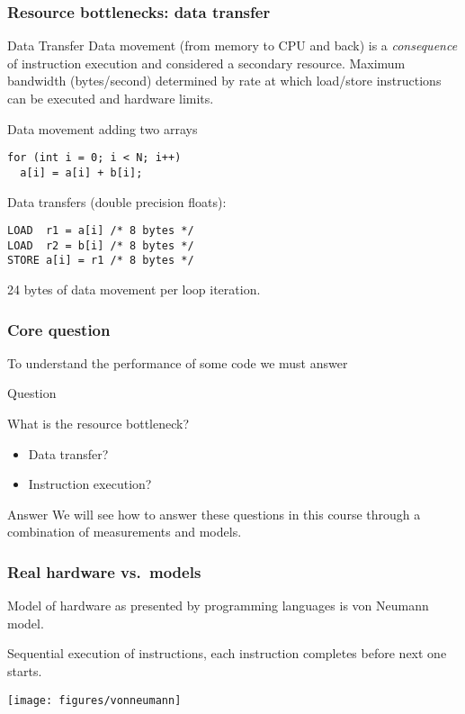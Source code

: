 \documentclass[presentation,aspectratio=43,10pt]{beamer}
\begin{document}
\begin{frame}[fragile]
  \frametitle{Resource bottlenecks: data transfer}
  \begin{block}{Data Transfer}
    Data movement (from memory to CPU and back) is a
    \emph{consequence} of instruction execution and considered a
    secondary resource. Maximum bandwidth (bytes/second) determined by
    rate at which load/store instructions can be executed and hardware limits.
  \end{block}
  \begin{exampleblock}{Data movement adding two arrays}
\begin{verbatim}
for (int i = 0; i < N; i++)
  a[i] = a[i] + b[i];
\end{verbatim}

    Data transfers (double precision floats):
\begin{verbatim}
LOAD  r1 = a[i] /* 8 bytes */
LOAD  r2 = b[i] /* 8 bytes */
STORE a[i] = r1 /* 8 bytes */
\end{verbatim}

    24 bytes of data movement per loop iteration.
  \end{exampleblock}
\end{frame}

\begin{frame}
  \frametitle{Core question}
  To understand the performance of some code we must answer

  \begin{challenge}{Question}
    \begin{center}
      {\Large What is the resource bottleneck? }
    \end{center}
    \begin{itemize}
    \item Data transfer?
    \item Instruction execution?
    \end{itemize}
  \end{challenge}
  \pause
  \begin{answer}{Answer}
    We will see how to answer these questions in this course through a
    combination of measurements and models.
  \end{answer}
\end{frame}

\begin{frame}
  \frametitle{Real hardware vs.~models}
  Model of hardware as presented by programming languages is von
  Neumann model.

  Sequential execution of instructions, each instruction completes
  before next one starts.

  \begin{center}
    \texttt{[image: figures/vonneumann]}
  \end{center}
\end{frame}
\end{document}
